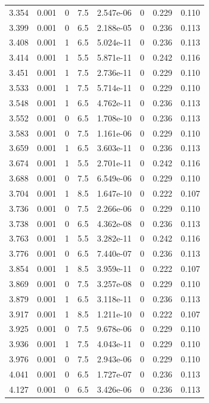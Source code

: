 \documentclass[preview]{standalone}
\begin{document}
{{{\begin{tabular}{L{1.2cm}C{1.2cm} C{0.3cm}C{0.5cm} C{1.4cm}C{1.4cm} C{1.4cm}C{1.4cm}}
  3.354  &  0.001  & 0     & 7.5 &  2.547e-06  & 0  & 0.229 &  0.110   \\ 
  3.399  &  0.001  & 0     & 6.5 &  2.188e-05  & 0  & 0.236 &  0.113   \\ 
  3.408  &  0.001  & 1     & 6.5 &  5.024e-11  & 0  & 0.236 &  0.113   \\ 
  3.414  &  0.001  & 1     & 5.5 &  5.871e-11  & 0  & 0.242 &  0.116   \\ 
  3.451  &  0.001  & 1     & 7.5 &  2.736e-11  & 0  & 0.229 &  0.110   \\ 
  3.533  &  0.001  & 1     & 7.5 &  5.714e-11  & 0  & 0.229 &  0.110   \\ 
  3.548  &  0.001  & 1     & 6.5 &  4.762e-11  & 0  & 0.236 &  0.113   \\ 
  3.552  &  0.001  & 0     & 6.5 &  1.708e-10  & 0  & 0.236 &  0.113   \\ 
  3.583  &  0.001  & 0     & 7.5 &  1.161e-06  & 0  & 0.229 &  0.110   \\ 
  3.659  &  0.001  & 1     & 6.5 &  3.603e-11  & 0  & 0.236 &  0.113   \\ 
  3.674  &  0.001  & 1     & 5.5 &  2.701e-11  & 0  & 0.242 &  0.116   \\ 
  3.688  &  0.001  & 0     & 7.5 &  6.549e-06  & 0  & 0.229 &  0.110   \\ 
  3.704  &  0.001  & 1     & 8.5 &  1.647e-10  & 0  & 0.222 &  0.107   \\ 
  3.736  &  0.001  & 0     & 7.5 &  2.266e-06  & 0  & 0.229 &  0.110   \\ 
  3.738  &  0.001  & 0     & 6.5 &  4.362e-08  & 0  & 0.236 &  0.113   \\ 
  3.763  &  0.001  & 1     & 5.5 &  3.282e-11  & 0  & 0.242 &  0.116   \\ 
  3.776  &  0.001  & 0     & 6.5 &  7.440e-07  & 0  & 0.236 &  0.113   \\ 
  3.854  &  0.001  & 1     & 8.5 &  3.959e-11  & 0  & 0.222 &  0.107   \\ 
  3.869  &  0.001  & 0     & 7.5 &  3.257e-08  & 0  & 0.229 &  0.110   \\ 
  3.879  &  0.001  & 1     & 6.5 &  3.118e-11  & 0  & 0.236 &  0.113   \\ 
  3.917  &  0.001  & 1     & 8.5 &  1.211e-10  & 0  & 0.222 &  0.107   \\ 
  3.925  &  0.001  & 0     & 7.5 &  9.678e-06  & 0  & 0.229 &  0.110   \\ 
  3.936  &  0.001  & 1     & 7.5 &  4.043e-11  & 0  & 0.229 &  0.110   \\ 
  3.976  &  0.001  & 0     & 7.5 &  2.943e-06  & 0  & 0.229 &  0.110   \\ 
  4.041  &  0.001  & 0     & 6.5 &  1.727e-07  & 0  & 0.236 &  0.113   \\ 
  4.127  &  0.001  & 0     & 6.5 &  3.426e-06  & 0  & 0.236 &  0.113   \\ 
\hline 
\end{tabular} 

}}}
\end{document}
